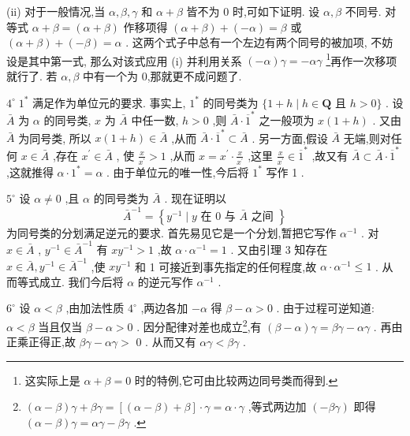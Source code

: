 (ii) 对于一般情况,当 \(\alpha ,\beta ,\gamma\) 和 \(\alpha  + \beta\) 皆不为 0 时,可如下证明. 设 \(\alpha ,\beta\) 不同号. 对等式 \(\alpha  + \beta  = \left( {\alpha  + \beta }\right)\) 作移项得 \(\left( {\alpha  + \beta }\right)  + \left( {-\alpha }\right)  = \beta\) 或 \(\left( {\alpha  + \beta }\right)  + \left( {-\beta }\right)  = \alpha\) . 这两个式子中总有一个左边有两个同号的被加项, 不妨设是其中第一式, 那么对该式应用 (i) 并利用关系 \(\left( {-\alpha }\right) \gamma  =  - \alpha {\gamma }\) \footnote{这实际上是 \(\alpha  + \beta  = 0\) 时的特例,它可由比较两边同号类而得到.}再作一次移项就行了. 若 \(\alpha ,\beta\) 中有一个为 0,那就更不成问题了.

\({4}^{ \circ  }\;{1}^{ * }\) 满足作为单位元的要求. 事实上, \({1}^{ * }\) 的同号类为 \(\{ 1 + h \mid  h \in  \mathbf{Q}\) 且 \(h > 0\}\) . 设 \(\bar{A}\) 为 \(\alpha\) 的同号类, \(x\) 为 \(\bar{A}\) 中任一数, \(h > 0\) ,则 \(\bar{A} \cdot  {\overline{1}}^{ * }\) 之一般项为 \(x\left( {1 + h}\right)\) . 又由 \(\bar{A}\) 为同号类, 所以 \(x\left( {1 + h}\right)  \in  \bar{A}\) ,从而 \(\bar{A} \cdot  {\overline{1}}^{ * } \subset  \bar{A}\) . 另一方面,假设 \(\bar{A}\) 无端,则对任何 \(x \in  \bar{A}\) ,存在 \({x}^{\prime } \in  \bar{A}\) , 使 \(\frac{x}{{x}^{\prime }} > 1\) ,从而 \(x = {x}^{\prime } \cdot  \frac{x}{{x}^{\prime }}\) ,这里 \(\frac{x}{{x}^{\prime }} \in  {\overline{1}}^{ * }\) ,故又有 \(\bar{A} \subset  \bar{A} \cdot  {\overline{1}}^{ * }\) ,这就推得 \(\alpha  \cdot  {1}^{ * } = \alpha\) . 由于单位元的唯一性,今后将 \({1}^{ * }\) 写作 1 .

\({5}^{ \circ  }\) 设 \(\alpha  \neq  0\) ,且 \(\alpha\) 的同号类为 \(\bar{A}\) . 现在证明以
\[
{\bar{A}}^{-1} = \left\{  {{y}^{-1} \mid  y\text{ 在 }0\text{ 与 }\bar{A}\text{ 之间 }}\right\}
\]
为同号类的分划满足逆元的要求. 首先易见它是一个分划,暂把它写作 \({\alpha }^{-1}\) . 对 \(x \in  \bar{A}\) , \({y}^{-1} \in  {\bar{A}}^{-1}\) 有 \(x{y}^{-1} > 1\) ,故 \(\alpha  \cdot  {\alpha }^{-1} = 1\) . 又由引理 3 知存在 \(x \in  \bar{A},{y}^{-1} \in  {\bar{A}}^{-1}\) ,使 \(x{y}^{-1}\) 和 1 可接近到事先指定的任何程度,故 \(\alpha  \cdot  {\alpha }^{-1} \leq  1\) . 从而等式成立. 我们今后将 \(\alpha\) 的逆元写作 \({\alpha }^{-1}\) .

\({6}^{ \circ  }\) 设 \(\alpha  < \beta\) ,由加法性质 \({4}^{ \circ  }\) ,两边各加 \(- \alpha\) 得 \(\beta  - \alpha  > 0\) . 由于过程可逆知道: \(\alpha  < \beta\) 当且仅当 \(\beta  - \alpha  > 0\) . 因分配律对差也成立\footnote{\(\left( {\alpha  - \beta }\right) \gamma  + {\beta \gamma } = \left\lbrack  {\left( {\alpha  - \beta }\right)  + \beta }\right\rbrack   \cdot  \gamma  = \alpha  \cdot  \gamma\) ,等式两边加 \(\left( {-{\beta \gamma }}\right)\) 即得 \(\left( {\alpha  - \beta }\right) \gamma  = {\alpha \gamma } - {\beta \gamma }\) .},有 \(\left( {\beta  - \alpha }\right) \gamma  = {\beta \gamma } - {\alpha \gamma }\) . 再由正乘正得正,故 \({\beta \gamma } - {\alpha \gamma } >\) 0 . 从而又有 \({\alpha \gamma } < {\beta \gamma }\) .

